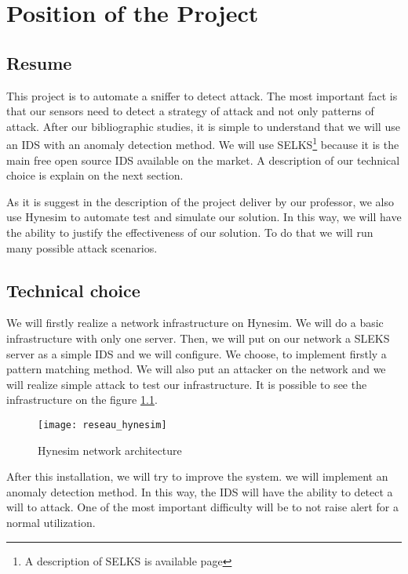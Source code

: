 
\chapter{Position of the Project}
\label{chap:project}


\section{Resume}

This project is to automate a sniffer to detect attack. The most important fact is that our sensors need to detect
a strategy of attack and not only patterns of attack. After our bibliographic studies, it is simple to understand
that we will use an IDS with an anomaly detection method. We will use SELKS\footnote{A description of SELKS is
  available page \pageref{chap:selks}} because it is the main free open source
IDS available on the market. A description of our technical choice is explain on the next section.

As it is suggest in the description of the project deliver by our professor, we also use Hynesim to automate test
and simulate our solution. In this way, we will have the ability to justify the effectiveness of our solution.
To do that we will run many possible attack scenarios.

\section{Technical choice}

We will firstly realize a network infrastructure on Hynesim. We will do a basic infrastructure with only one server.
Then, we will put on our network a SLEKS server as a simple IDS and we will configure. We choose, to implement firstly
a pattern matching method. We will also put an attacker on the network and we will realize simple attack to test our
infrastructure. It is possible to see the infrastructure on the figure \ref{fig:network_hynesim}.

\begin{figure}[h]
  \centering
  \texttt{[image: reseau\_hynesim]}
  \caption{Hynesim network architecture}
  \label{fig:network_hynesim}
\end{figure}

After this installation, we will try to improve the system. we will implement an anomaly detection method. In this
way, the IDS will have the ability to detect a will to attack. One of the most important difficulty will be to not
raise alert for a normal utilization.

